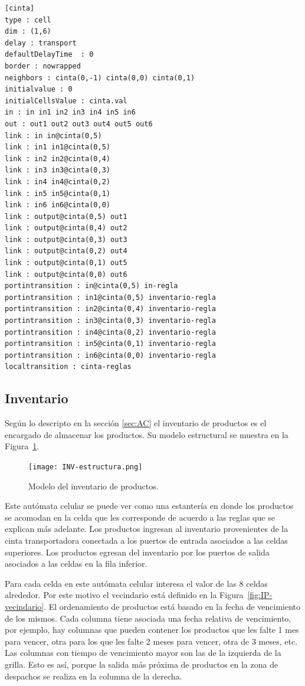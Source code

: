 \documentclass[10pt]{article}
\begin{document}
\begin{minipage}{1\textwidth}
	\centering
	\begin{lstlisting}
[cinta]
type : cell
dim : (1,6)
delay : transport
defaultDelayTime  : 0
border : nowrapped
neighbors : cinta(0,-1) cinta(0,0) cinta(0,1)
initialvalue : 0
initialCellsValue : cinta.val
in : in in1 in2 in3 in4 in5 in6
out : out1 out2 out3 out4 out5 out6
link : in in@cinta(0,5)
link : in1 in1@cinta(0,5)
link : in2 in2@cinta(0,4)
link : in3 in3@cinta(0,3)
link : in4 in4@cinta(0,2)
link : in5 in5@cinta(0,1)
link : in6 in6@cinta(0,0)
link : output@cinta(0,5) out1
link : output@cinta(0,4) out2
link : output@cinta(0,3) out3
link : output@cinta(0,2) out4
link : output@cinta(0,1) out5
link : output@cinta(0,0) out6
portintransition : in@cinta(0,5) in-regla
portintransition : in1@cinta(0,5) inventario-regla
portintransition : in2@cinta(0,4) inventario-regla
portintransition : in3@cinta(0,3) inventario-regla
portintransition : in4@cinta(0,2) inventario-regla
portintransition : in5@cinta(0,1) inventario-regla
portintransition : in6@cinta(0,0) inventario-regla
localtransition : cinta-reglas
	\end{lstlisting}
\end{minipage}

\subsection{Inventario}\label{sec:IP}
Según lo descripto en la sección \ref{sec:AC} el inventario de productos es el encargado de almacenar los productos. Su modelo estructural se muestra en la Figura~\ref{fig:IP-estructura}.

\begin{figure}[h] 
	\centering 
	\texttt{[image: INV-estructura.png]} 
	\caption{Modelo del inventario de productos.} 
	\label{fig:IP-estructura} 
\end{figure}

Este autómata celular se puede ver como una estantería en donde los productos se acomodan en la celda que les corresponde de acuerdo a las reglas que se explican más adelante. Los productos ingresan al inventario provenientes de la cinta transportadora conectada a los puertos de entrada asociados a las celdas superiores. Los productos egresan del inventario por los puertos de salida asociados a las celdas en la fila inferior.

Para cada celda en este autómata celular interesa el valor de las $8$ celdas alrededor. Por este motivo el vecindario está definido en la Figura~\ref{fig:IP-vecindario}. El ordenamiento de productos está basado en la fecha de vencimiento de los mismos. Cada columna tiene asociada una fecha relativa de vencimiento, por ejemplo, hay columnas que pueden contener los productos que les falte 1 mes para vencer, otra para los que les falte 2 meses para vencer, otra de 3 meses, etc. Las columnas con tiempo de vencimiento mayor son las de la izquierda de la grilla. Esto es así, porque la salida más próxima de productos en la zona de despachos se realiza en la columna de la derecha.
\end{document}

